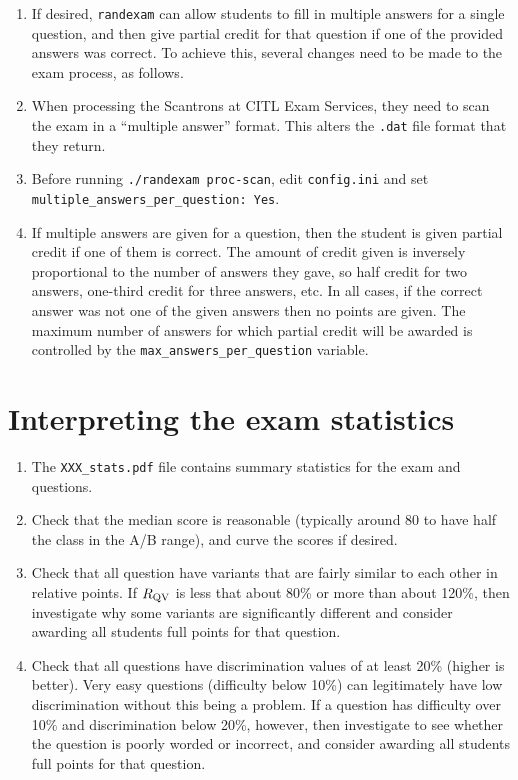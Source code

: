 \documentclass{article}
\begin{document}
\begin{enumerate}
\item If desired, \texttt{randexam} can allow students to fill in
  multiple answers for a single question, and then give partial credit
  for that question if one of the provided answers was correct. To
  achieve this, several changes need to be made to the exam process,
  as follows.
\item When processing the Scantrons at CITL Exam Services, they need
  to scan the exam in a ``multiple answer'' format. This alters the
  \texttt{.dat} file format that they return.
\item Before running \texttt{./randexam proc-scan}, edit
  \texttt{config.ini} and set \texttt{multiple_answers_per_question:
    Yes}.
\item If multiple answers are given for a question, then the student
  is given partial credit if one of them is correct. The amount of
  credit given is inversely proportional to the number of answers they
  gave, so half credit for two answers, one-third credit for three
  answers, etc. In all cases, if the correct answer was not one of the
  given answers then no points are given. The maximum number of
  answers for which partial credit will be awarded is controlled by
  the \texttt{max_answers_per_question} variable.
\end{enumerate}

\section{Interpreting the exam statistics}

\begin{enumerate}
\item The \texttt{XXX_stats.pdf} file contains summary statistics for
  the exam and questions.
\item Check that the median score is reasonable (typically around 80
  to have half the class in the A/B range), and curve the scores if
  desired.
\item Check that all question have variants that are fairly similar to
  each other in relative points. If $R_{\rm QV}$ is less that about
  80\% or more than about 120\%, then investigate why some variants
  are significantly different and consider awarding all students full
  points for that question.
\item Check that all questions have discrimination values of at least
  20\% (higher is better). Very easy questions (difficulty below 10\%)
  can legitimately have low discrimination without this being a
  problem. If a question has difficulty over 10\% and discrimination
  below 20\%, however, then investigate to see whether the question is
  poorly worded or incorrect, and consider awarding all students full
  points for that question.
\end{enumerate}
\end{document}
